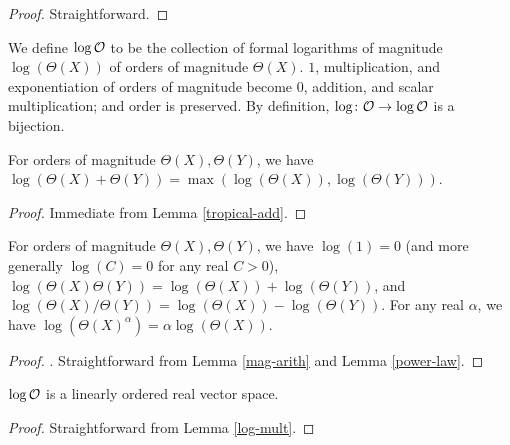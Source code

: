 \begin{proof} Straightforward.
\end{proof}

\begin{definition} \label{log-order-def}  We define $\log {\mathcal O}$ to be the collection of formal logarithms of magnitude $\log(\Theta(X))$ of orders of magnitude $\Theta(X)$.  $1$, multiplication, and exponentiation of orders of magnitude become $0$, addition, and scalar multiplication; and order is preserved. By definition, $\log \colon {\mathcal O} \to \log {\mathcal O}$ is a bijection.
\end{definition}

\begin{lemma}\label{log-add}  For orders of magnitude $\Theta(X), \Theta(Y)$, we have $\log(\Theta(X) + \Theta(Y)) = \max(\log(\Theta(X)), \log(\Theta(Y)))$.
\end{lemma}

\begin{proof} Immediate from Lemma \ref{tropical-add}.
\end{proof}

\begin{lemma}\label{log-mult}  For orders of magnitude $\Theta(X), \Theta(Y)$, we have $\log(1) = 0$ (and more generally $\log(C) = 0$ for any real $C>0$), $\log(\Theta(X) \Theta(Y)) = \log(\Theta(X)) + \log(\Theta(Y))$, and $\log(\Theta(X) / \Theta(Y)) = \log(\Theta(X)) - \log(\Theta(Y))$.  For any real $\alpha$, we have $\log(\Theta(X)^\alpha) = \alpha \log(\Theta(X))$.
\end{lemma}

\begin{proof}. Straightforward from Lemma \ref{mag-arith} and Lemma \ref{power-law}.
\end{proof}

\begin{lemma}\label{ord-vec} $\log {\mathcal O}$ is a linearly ordered real vector space.
\end{lemma}

\begin{proof} Straightforward from Lemma \ref{log-mult}.
\end{proof}
